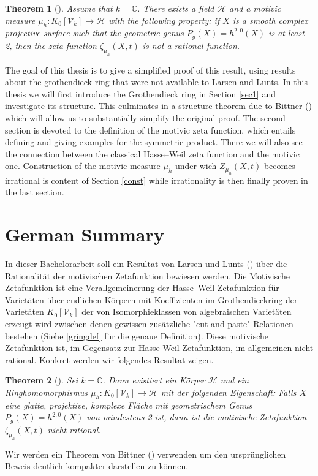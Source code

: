 \documentclass[11pt, a4paper, german]{article}
\theoremstyle{plain}
\newtheorem{theorem}{Theorem}[section]
\theoremstyle{definition}
\newcommand{\gring}[1][k]{K_0[\mathcal{V}_#1]}
\begin{document}
\begin{theorem}[{\cite[Thm. 1.6]{MR1996804}}]
\label{irrational}
Assume that $k = \mathbb{C}$. There exists a field $\mathcal{H}$ and a motivic measure $\mu_h \colon \gring \to \mathcal{H}$ with the following
property: if $X$ is a smooth complex projective surface such that the geometric genus $P_g(X)=h^{2,0}(X)$ is at least 2, 
then the zeta-function $\zeta_{\mu_h}(X,t)$ is not a rational function.
\end{theorem}

The goal of this thesis is to give a simplified proof of this result, using results about the grothendieck ring that were not available
to Larsen and Lunts.
In this thesis we will first introduce the Grothendieck ring in Section \ref{sec1} and investigate its structure. 
This culminates in a structure theorem due to Bittner (\cite[Thm 3.1]{Bittner}) which will allow us to substantially simplify the original 
proof.
The second section is devoted to the definition of the motivic zeta function, which entails defining and giving examples for the symmetric 
product. There we will also see the connection between the classical Hasse--Weil zeta function and the motivic one.
Construction of the motivic measure $\mu_h$ under wich $Z_{\mu_h}(X,t)$ becomes irrational is content of Section \ref{const} while irrationality
is then finally proven in the last section.

\section{German Summary}
In dieser Bachelorarbeit soll ein Resultat von Larsen und Lunts (\cite{MR1996804}) über die Rationalität der motivischen Zetafunktion
bewiesen werden. Die Motivische Zetafunktion ist eine Verallgemeinerung der Hasse--Weil Zetafunktion für Varietäten über endlichen Körpern
mit Koeffizienten im Grothendieckring der Varietäten $\gring[k]$ der von Isomorphieklassen von algebraischen Varietäten erzeugt wird 
zwischen denen gewissen zusätzliche "cut-and-paste" Relationen bestehen (Siehe \ref{gringdef} für die genaue Definition). 
Diese motivische Zetafunktion ist, im Gegensatz zur Hasse-Weil Zetafunktion, im allgemeinen nicht rational. 
Konkret werden wir folgendes Resultat zeigen.
\begin{theorem}[{\cite[Thm. 1.6]{MR1996804}}]
Sei $k = \mathbb{C}$. Dann existiert ein Körper $\mathcal{H}$ und ein Ringhomomorphismus $\mu_h \colon \gring \to \mathcal{H}$ mit der folgenden
Eigenschaft: Falls $X$ eine glatte, projektive, komplexe Fläche mit geometrischem Genus $P_g(X) = h^{2,0}(X)$ von mindestens 2 ist, dann ist die
motivische Zetafunktion $\zeta_{\mu_h}(X,t)$ nicht rational.
\end{theorem}
Wir werden ein Theorem von Bittner (\cite{Bittner}) verwenden um den ursprünglichen Beweis deutlich kompakter darstellen zu können.
\end{document}
